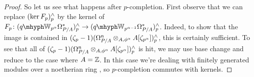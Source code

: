\documentclass[DIV=12,numbers=enddot,leqno,bibliography=totoc]{scrartcl}
\begin{document}
\begin{proof}
		So let us see what happens after $p$-completion. First observe that we can replace $(\ker F_p)_p^\wedge$ by the kernel of $F_p\colon (\qIW_{p^{\alpha}}\Omega_{P/A}^*)_p^\complete\rightarrow(\qIW_{p^{\alpha-1}}\Omega_{P/A}^*)_p^\complete$. Indeed, to show that the image is contained in $(\zeta_p-1)(\Omega_{P/A}^n\otimes_{A,\phi^\alpha}A[\zeta_{p^\alpha}])_p^\wedge$, this is certainly sufficient. To see that all of $(\zeta_p-1)(\Omega_{P/A}^n\otimes_{A,\phi^\alpha}A[\zeta_{p^\alpha}])_p^\wedge$ is hit, we may use base change \cite[Lemma~]{qWitt} and reduce to the case where $A=\mathbb{Z}$. In this case we're dealing with finitely generated modules over a noetherian ring \cite[Corollary~ and Proposition~({[$a$]})]{qWitt}, so $p$-completion commutes with kernels.
		

\end{proof}
\end{document}
